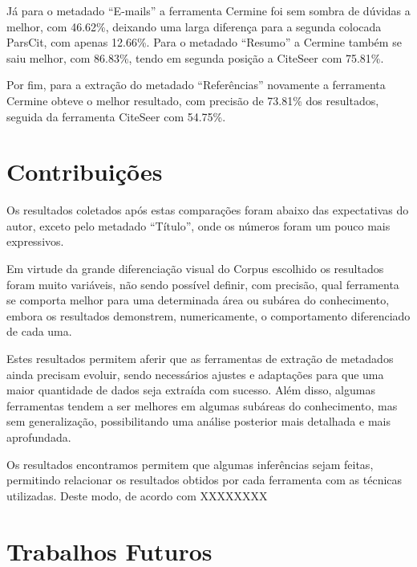 Já para o metadado ``E-mails'' a ferramenta Cermine foi sem sombra de dúvidas a melhor, com 46.62\%, deixando uma larga diferença para a segunda colocada ParsCit, com apenas 12.66\%. Para o metadado ``Resumo'' a Cermine também se saiu melhor, com 86.83\%, tendo em segunda posição a CiteSeer com 75.81\%.

Por fim, para a extração do metadado ``Referências'' novamente a ferramenta Cermine obteve o melhor resultado, com precisão de 73.81\% dos resultados, seguida da ferramenta CiteSeer com 54.75\%.



\section{Contribuições}
\label{sec:contributions}

Os resultados coletados após estas comparações foram abaixo das expectativas do autor, exceto pelo metadado ``Título'', onde os números foram um pouco mais expressivos.

Em virtude da grande diferenciação visual do Corpus escolhido os resultados foram muito variáveis, não sendo possível definir, com precisão, qual ferramenta se comporta melhor para uma determinada área ou subárea do conhecimento, embora os resultados demonstrem, numericamente, o comportamento diferenciado de cada uma.

Estes resultados permitem aferir que as ferramentas de extração de metadados ainda precisam evoluir, sendo necessários ajustes e adaptações para que uma maior quantidade de dados seja extraída com sucesso. Além disso, algumas ferramentas tendem a ser melhores em algumas subáreas do conhecimento, mas sem generalização, possibilitando uma análise posterior mais detalhada e mais aprofundada.

Os resultados encontramos permitem que algumas inferências sejam feitas, permitindo relacionar os resultados obtidos por cada ferramenta com as técnicas utilizadas. Deste modo, de acordo com XXXXXXXX


\section{Trabalhos Futuros}
\label{sec:future-work}

